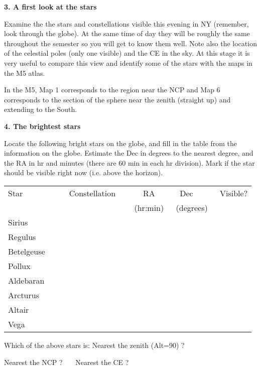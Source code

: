 \bigskip\noindent
{\bf 3. A first look at the stars}

\medskip
\noindent 
Examine the the stars and constellations visible this evening in NY
(remember, look through the globe). At
the same time of day they will be roughly the same throughout the
semester so you will get to know them well. Note also the location of
the celestial poles (only one visible) and the CE in the sky. At this
stage it is very useful to compare this view and identify some of the
stars with the maps in the M5 atlas.

In the M5, Map 1 corresponds to the region near the NCP and Map 6
corresponds to the section of the sphere near the zenith (straight up)
and extending to the South.


\newpage

\bigskip\noindent
{\bf 4. The brightest stars}

\bigskip\noindent
Locate the following bright stars on the globe,
and fill in the table from the information on the globe. Estimate the
Dec in degrees to the nearest degree, and the RA in hr and minutes
(there are 60 min in each hr division). Mark if the star should be
visible right now (i.e. above the horizon).
\begin{center}
\begin{tabular}{lcccc} \hline
Star  & \ \ \ \ Constellation \ \ &\hspace{1.5cm} RA \hspace{1.5cm}
          & \ \ Dec \ \ \ \ & Visible?\\
          &     & (hr:min) & (degrees)   \\ \hline
Sirius   &  &   &        & \\ \hline
Regulus   &  &   &       & \\ \hline
Betelgeuse  &  &   &       & \\ \hline
Pollux  &  &   &       & \\ \hline
Aldebaran  &  &   &       & \\  \hline
Arcturus &  &   &     & \\  \hline 
Altair &  &   &     & \\  \hline 
Vega &  &   &     & \\  \hline 
\end{tabular}
\end{center}

\bigskip
Which of the above stars is:
\medskip
Nearest the zenith (Alt=90\deg) ? \ \makebox[4cm]{\hrulefill}

Nearest the NCP  ?\ \makebox[4cm]{\hrulefill} \ \ 
Nearest the CE   ?\ \makebox[4cm]{\hrulefill}

